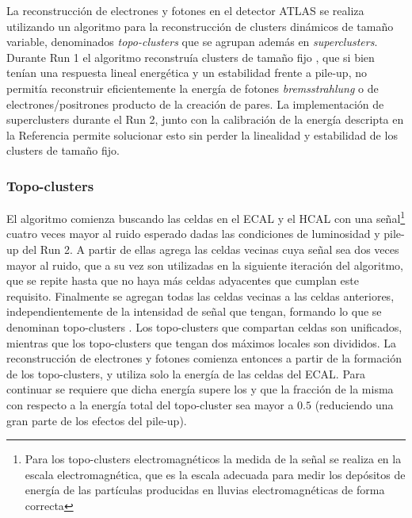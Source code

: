 La reconstrucción de electrones y fotones en el detector ATLAS se realiza utilizando un algoritmo para la reconstrucción de clusters dinámicos de tamaño variable, denominados \textit{topo-clusters} que se agrupan además en \textit{superclusters}\cite{EGAM-2018-01}. Durante Run 1 el algoritmo reconstruía clusters de tamaño fijo \cite{PERF-2013-04, PERF-2013-05, Lampl:1099735}, que si bien tenían una respuesta lineal energética y un estabilidad frente a pile-up, no permitía reconstruir eficientemente la energía de fotones \textit{bremsstrahlung} o de electrones/positrones producto de la creación de pares. La implementación de superclusters durante el Run 2, junto con la calibración de la energía descripta en la Referencia \cite{PERF-2017-03} permite solucionar esto sin perder la linealidad y estabilidad de los clusters de tamaño fijo.

\subsubsection{Topo-clusters}

El algoritmo comienza buscando las celdas en el ECAL y el HCAL con una señal\footnote{Para los topo-clusters electromagnéticos la medida de la señal se realiza en la escala electromagnética, que es la escala adecuada para medir los depósitos de energía de las partículas producidas en lluvias electromagnéticas de forma correcta} 
cuatro veces mayor al ruido esperado dadas las condiciones de luminosidad y pile-up del Run 2. A partir de ellas agrega las celdas vecinas cuya señal sea dos veces mayor al ruido,
que a su vez son utilizadas en la siguiente iteración del algoritmo, que se repite hasta que no haya más celdas adyacentes que cumplan este requisito. Finalmente se agregan todas las celdas vecinas a las celdas anteriores, independientemente de la intensidad de señal que tengan, formando lo que se denominan topo-clusters \cite{PERF-2014-07, Lampl:1099735}. Los topo-clusters que compartan celdas son unificados, mientras que los topo-clusters que tengan dos máximos locales son divididos. La reconstrucción de electrones y fotones comienza entonces a partir de la formación de los topo-clusters, y utiliza solo la energía de las celdas del ECAL. Para continuar se requiere que dicha energía supere los  y que la fracción de la misma con respecto a la energía total del topo-cluster sea mayor a $0.5$ (reduciendo una gran parte de los efectos del pile-up).  

